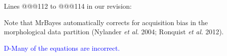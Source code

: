 \documentclass[11pt]{letter}
\begin{document}
\begin{letter}{}
Lines @@@112 to @@@114 in our revision:

\hfill\begin{minipage}{\dimexpr\textwidth-1cm}
Note that MrBayes automatically corrects for acquisition bias in the morphological data partition (Nylander \textit{et al.} 2004; Ronquist \textit{et al.} 2012).
\end{minipage}




\textcolor{blue}{D-Many of the equations are incorrect.} %


\end{letter}
\end{document}
